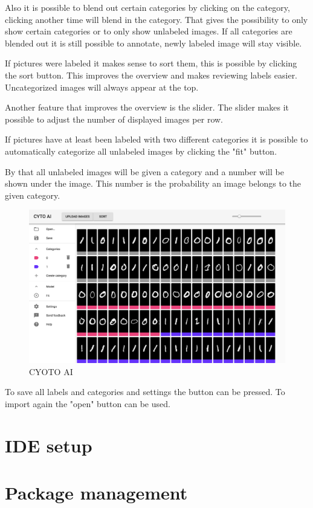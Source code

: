 Also it is possible to blend out certain categories by clicking on the category, clicking another time will blend in the category. That gives the possibility to only show certain categories or to only show unlabeled images.
If all categories are blended out it is still possible to annotate, newly labeled image will stay visible.

If pictures were labeled it makes sense to sort them, this is possible by clicking the sort button. This improves the overview and makes reviewing labels easier. Uncategorized images will always appear at the top.

Another feature that improves the overview is the slider. The slider makes it possible to adjust the number of displayed images per row. 

If pictures have at least been labeled with two different categories it is possible to automatically categorize all unlabeled images by clicking the "fit" button.

By that all unlabeled images will be given a category and a number will be shown under the image. This number is the probability an image belongs to the given category.

\begin{figure}[H]
	\centering
	\includegraphics[width=0.8\linewidth]{bilder/cyto/cyto.png}
	\caption{CYOTO AI}
	\label{fig:COMPONENT}
\end{figure}

To save all labels and categories and settings the button can be pressed. To import again the "open" button can be used.

\section{IDE setup}

\section{Package management}

